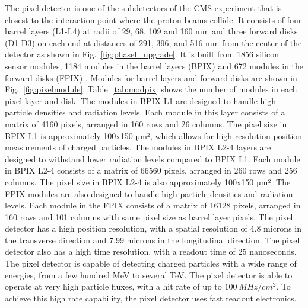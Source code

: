 The pixel detector is one of the subdetectors of the CMS experiment that is closest to the interaction point where the proton beams collide. It consists of four barrel layers (L1-L4) at radii of 29, 68, 109 and 160 mm and three forward disks (D1-D3) on each end at distances of 291, 396, and 516 mm from the center of the detector as shown in Fig.~\ref{fig:phaseI_upgrade}. It is built from 1856 silicon sensor modules, 1184 modules in the barrel layers (BPIX) and 672 modules in the forward disks (FPIX) \cite{Adam:2748381}. Modules for barrel layers and forward disks are shown in Fig.~\ref{fig:pixelmodule}. Table~\ref{tab:modpix} shows the number of modules in each pixel layer and disk. The modules in BPIX L1 are designed to handle high particle densities and radiation levels. Each module in this layer consists of a matrix of 4160 pixels, arranged in 160 rows and 26 columns. The pixel size in BPIX L1 is approximately 100x150 µm², which allows for high-resolution position measurements of charged particles. The modules in BPIX L2-4 layers are designed to withstand lower radiation levels compared to BPIX L1. Each module in BPIX L2-4 consists of a matrix of 66560 pixels, arranged in 260 rows and 256 columns. The pixel size in BPIX L2-4 is also approximately 100x150 µm². The FPIX modules are also designed to handle high particle densities and radiation levels. Each module in the FPIX consists of a matrix of 16128 pixels, arranged in 160 rows and 101 columns with same pixel size as barrel layer pixels.
The pixel detector has a high position resolution, with a spatial resolution of 4.8  microns in the transverse direction and 7.99 microns in the longitudinal direction. The pixel detector also has a high time resolution, with a readout time of 25 nanoseconds. The pixel detector is capable of detecting charged particles with a wide range of energies, from a few hundred MeV to several TeV. The pixel detector is able to operate at very high particle fluxes, with a hit rate of up to $100 \: MHz/cm^2$. To achieve this high rate capability, the pixel detector uses fast readout electronics.
